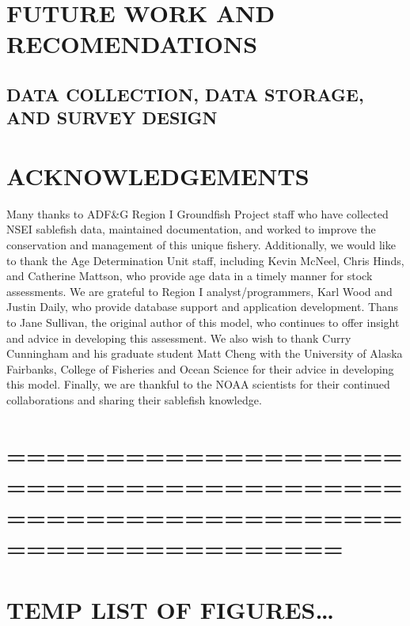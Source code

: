 \documentclass[
]{article}
\begin{document}
\hypertarget{future-work-and-recomendations}{%
\section{FUTURE WORK AND RECOMENDATIONS}\label{future-work-and-recomendations}}

\hypertarget{data-collection-data-storage-and-survey-design}{%
\subsection{DATA COLLECTION, DATA STORAGE, AND SURVEY DESIGN}\label{data-collection-data-storage-and-survey-design}}

\hypertarget{acknowledgements}{%
\section{ACKNOWLEDGEMENTS}\label{acknowledgements}}

Many thanks to ADF\&G Region I Groundfish Project staff who have collected NSEI sablefish data, maintained documentation, and worked to improve the conservation and management of this unique fishery. Additionally, we would like to thank the Age Determination Unit staff, including Kevin McNeel, Chris Hinds, and Catherine Mattson, who provide age data in a timely manner for stock assessments. We are grateful to Region I analyst/programmers, Karl Wood and Justin Daily, who provide database support and application development. Thans to Jane Sullivan, the original author of this model, who continues to offer insight and advice in developing this assessment. We also wish to thank Curry Cunningham and his graduate student Matt Cheng with the University of Alaska Fairbanks, College of Fisheries and Ocean Science for their advice in developing this model. Finally, we are thankful to the NOAA scientists for their continued collaborations and sharing their sablefish knowledge.

\hypertarget{section}{%
\section{=============================================================================}\label{section}}

\hypertarget{temp-list-of-figures}{%
\section{TEMP LIST OF FIGURES\ldots{}}\label{temp-list-of-figures}}
\end{document}
